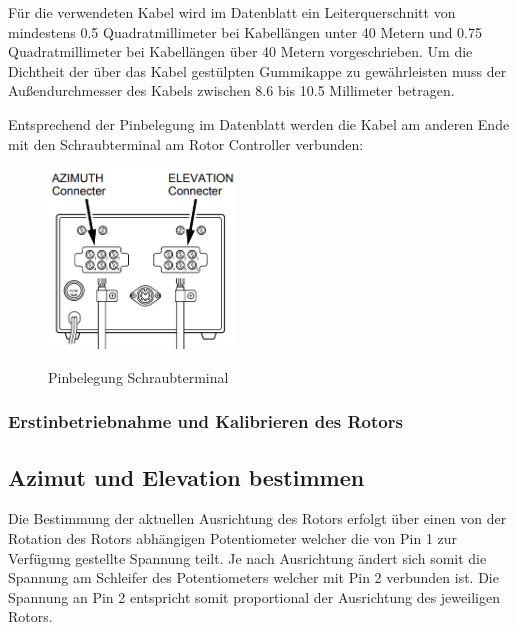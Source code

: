 Für die verwendeten Kabel wird im Datenblatt ein Leiterquerschnitt von mindestens 0.5 Quadratmillimeter bei Kabellängen unter 40 Metern und 0.75 Quadratmillimeter bei Kabellängen über 40 Metern vorgeschrieben. Um die Dichtheit der über das Kabel gestülpten Gummikappe zu gewährleisten muss der Außendurchmesser des Kabels zwischen 8.6 bis 10.5 Millimeter betragen.
 
Entsprechend der Pinbelegung im Datenblatt werden die Kabel am anderen Ende mit den Schraubterminal am Rotor Controller verbunden:
\begin{figure}[H]
	\cite{noauthor_yaesu_nodate}
	\centering
	\includegraphics[width=5cm]{../ref/RotorInstallationScrewTerminal.png}
	\label{fig:Rotor_Schraubterminal}
	\caption{Pinbelegung Schraubterminal}
\end{figure}

\subsubsection{Erstinbetriebnahme und Kalibrieren des Rotors}

\subsection {Azimut und Elevation bestimmen}
Die Bestimmung der aktuellen Ausrichtung des Rotors erfolgt über einen von der Rotation des Rotors abhängigen Potentiometer welcher die von Pin 1 zur Verfügung gestellte Spannung teilt. Je nach Ausrichtung ändert sich somit die Spannung am Schleifer des Potentiometers welcher mit Pin 2 verbunden ist. Die Spannung an Pin 2 entspricht somit proportional der Ausrichtung des jeweiligen Rotors.

